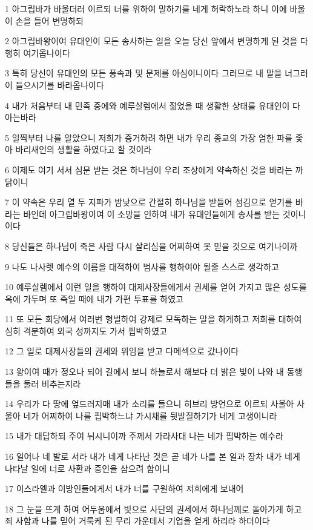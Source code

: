 \par 1 아그립바가 바울더러 이르되 너를 위하여 말하기를 네게 허락하노라 하니 이에 바울이 손을 들어 변명하되
\par 2 아그립바왕이여 유대인이 모든 송사하는 일을 오늘 당신 앞에서 변명하게 된 것을 다행히 여기옵나이다
\par 3 특히 당신이 유대인의 모든 풍속과 및 문제를 아심이니이다 그러므로 내 말을 너그러이 들으시기를 바라옵나이다
\par 4 내가 처음부터 내 민족 중에와 예루살렘에서 젊었을 때 생활한 상태를 유대인이 다 아는바라
\par 5 일찍부터 나를 알았으니 저희가 증거하려 하면 내가 우리 종교의 가장 엄한 파를 좇아 바리새인의 생활을 하였다고 할 것이라
\par 6 이제도 여기 서서 심문 받는 것은 하나님이 우리 조상에게 약속하신 것을 바라는 까닭이니
\par 7 이 약속은 우리 열 두 지파가 밤낮으로 간절히 하나님을 받들어 섬김으로 얻기를 바라는 바인데 아그립바왕이여 이 소망을 인하여 내가 유대인들에게 송사를 받는 것이니이다
\par 8 당신들은 하나님이 죽은 사람 다시 살리심을 어찌하여 못 믿을 것으로 여기나이까
\par 9 나도 나사렛 예수의 이름을 대적하여 범사를 행하여야 될줄 스스로 생각하고
\par 10 예루살렘에서 이런 일을 행하여 대제사장들에게서 권세를 얻어 가지고 많은 성도를 옥에 가두며 또 죽일 때에 내가 가편 투표를 하였고
\par 11 또 모든 회당에서 여러번 형벌하여 강제로 모독하는 말을 하게하고 저희를 대하여 심히 격분하여 외국 성까지도 가서 핍박하였고
\par 12 그 일로 대제사장들의 권세와 위임을 받고 다메섹으로 갔나이다
\par 13 왕이여 때가 정오나 되어 길에서 보니 하늘로서 해보다 더 밝은 빛이 나와 내 동행들을 둘러 비추는지라
\par 14 우리가 다 땅에 엎드러지매 내가 소리를 들으니 히브리 방언으로 이르되 사울아 사울아 네가 어찌하여 나를 핍박하느냐 가시채를 뒷발질하기가 네게 고생이니라
\par 15 내가 대답하되 주여 뉘시니이까 주께서 가라사대 나는 네가 핍박하는 예수라
\par 16 일어나 네 발로 서라 내가 네게 나타난 것은 곧 네가 나를 본 일과 장차 내가 네게 나타날 일에 너로 사환과 증인을 삼으려 함이니
\par 17 이스라엘과 이방인들에게서 내가 너를 구원하여 저희에게 보내어
\par 18 그 눈을 뜨게 하여 어두움에서 빛으로 사단의 권세에서 하나님께로 돌아가게 하고 죄 사함과 나를 믿어 거룩케 된 무리 가운데서 기업을 얻게 하리라 하더이다
